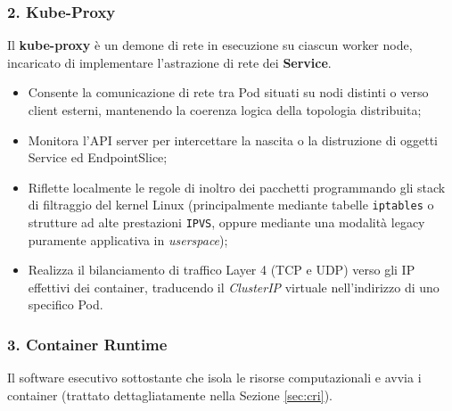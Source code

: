 \documentclass[11pt, a4paper]{article}
\begin{document}
\subsubsection{2. Kube-Proxy}
Il \textbf{kube-proxy} è un demone di rete in esecuzione su ciascun worker node, incaricato di implementare l'astrazione di rete dei \textbf{Service}.
\begin{itemize}[noitemsep]
    \item Consente la comunicazione di rete tra Pod situati su nodi distinti o verso client esterni, mantenendo la coerenza logica della topologia distribuita;
    \item Monitora l'API server per intercettare la nascita o la distruzione di oggetti Service ed EndpointSlice;
    \item Riflette localmente le regole di inoltro dei pacchetti programmando gli stack di filtraggio del kernel Linux (principalmente mediante tabelle \texttt{iptables} o strutture ad alte prestazioni \texttt{IPVS}, oppure mediante una modalità legacy puramente applicativa in \emph{userspace});
    \item Realizza il bilanciamento di traffico Layer 4 (TCP e UDP) verso gli IP effettivi dei container, traducendo il \emph{ClusterIP} virtuale nell'indirizzo di uno specifico Pod.
\end{itemize}

\subsubsection{3. Container Runtime}
Il software esecutivo sottostante che isola le risorse computazionali e avvia i container (trattato dettagliatamente nella Sezione \ref{sec:cri}).
\end{document}
